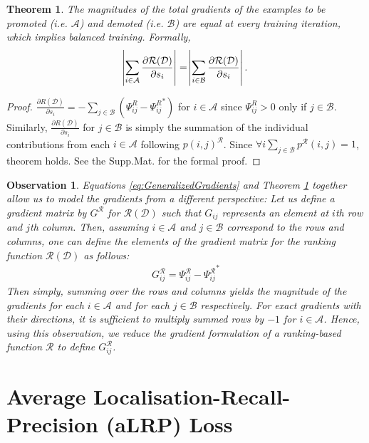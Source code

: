 \documentclass{article}
\newtheorem{theorem}{Theorem}
\newtheorem{observation}{Observation}
\begin{document}
{\begin{theorem} 
\label{theorem:BalancedTraining}
The magnitudes of the total gradients of the examples to be promoted (i.e. $\mathcal{A}$) and demoted (i.e. $\mathcal{B}$) are equal at every training iteration, which implies balanced training. Formally,
\begin{align}
\label{eq:Theorem1}
\abs{\sum \limits_{i \in \mathcal{A}} \frac{\partial \mathcal{R}(\mathcal{D})}{\partial s_i}} = \abs{\sum \limits_{i \in \mathcal{B}} \frac{\partial \mathcal{R}(\mathcal{D})}{\partial s_i}}.    
\end{align}
\end{theorem}
\begin{proof}
$\frac{\partial R(\mathcal{D})}{\partial s_i}=- \sum \limits_{j \in \mathcal{B}}  \left( { \Psi^R_{ij} - \Psi^R_{ij}}^*\right)$ for $i \in \mathcal{A}$ since $\Psi^R_{ij}>0$ only if $j \in \mathcal{B}$. Similarly, $\frac{\partial R(\mathcal{D})}{\partial s_i}$ for $j \in \mathcal{B}$ is simply the summation of the individual contributions from each $i \in \mathcal{A}$ following $p(i, j)^\mathcal{R}$. Since $\forall i \sum \limits_{j \in \mathcal{B}} p^\mathcal{R}(i, j) = 1$, theorem holds. See the Supp.Mat. for the formal proof.
\end{proof}
\begin{observation}
\label{observation:GradMatrix}
Equations \ref{eq:GeneralizedGradients} and Theorem \ref{theorem:BalancedTraining} together allow us to model the gradients from a different perspective: Let us define a gradient matrix by $G ^ \mathcal{R}$ for $\mathcal{R}(\mathcal{D})$ such that $G_{ij}$ represents an element at $i$th row and $j$th column. Then, assuming $i \in \mathcal{A}$ and $j \in \mathcal{B}$ correspond to the rows and columns, one can define the elements of the gradient matrix for the ranking function $\mathcal{R}(\mathcal{D})$ as follows:
\begin{align}
    G_{ij} ^ \mathcal{R} =\Psi^\mathcal{R}_{ij} - {\Psi^\mathcal{R}_{ij}}^* 
\end{align}
Then simply, summing over the rows and columns yields the magnitude of the gradients for each $i \in \mathcal{A}$ and for each $j \in \mathcal{B}$ respectively. For exact gradients with their directions, it is sufficient to multiply summed rows by $-1$ for $i \in \mathcal{A}$. Hence, using this observation, we reduce the gradient formulation of a ranking-based function $\mathcal{R}$ to define $G_{ij} ^ \mathcal{R}$.
\end{observation}
} \section{Average Localisation-Recall-Precision (aLRP) Loss}
\label{sec:aLRPLoss}
\end{document}
